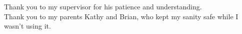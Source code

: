 

\begin{spacing}{1.0}
    Thank you to my supervisor for his patience and understanding.\\
    Thank you to my parents Kathy and Brian, who kept my sanity safe while I wasn't using it.   
\end{spacing}
